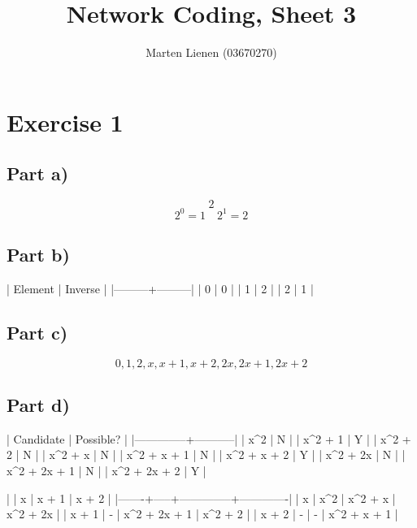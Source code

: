\documentclass[10pt,a4paper]{article}
\title{Network Coding, Sheet 3}
\author{Marten Lienen (03670270)}
\begin{document}
\maketitle

\section*{Exercise 1}

\subsection*{Part a)}

\begin{equation*}
  2
\end{equation*}
\begin{equation*}
  2^{0} = 1 \quad 2^{1} = 2
\end{equation*}

\subsection*{Part b)}

| Element | Inverse |
|---------+---------|
|       0 |       0 |
|       1 |       2 |
|       2 |       1 |

\subsection*{Part c)}

\begin{equation*}
  0, 1, 2, x, x + 1, x + 2, 2x, 2x + 1, 2x + 2
\end{equation*}

\subsection*{Part d)}

| Candidate    | Possible? |
|--------------+-----------|
| x^2          | N         |
| x^2 + 1      | Y         |
| x^2 + 2      | N         |
| x^2 + x      | N         |
| x^2 + x + 1  | N         |
| x^2 + x + 2  | Y         |
| x^2 + 2x     | N         |
| x^2 + 2x + 1 | N         |
| x^2 + 2x + 2 | Y         |

|       | x   | x + 1        | x + 2       |
|-------+-----+--------------+-------------|
| x     | x^2 | x^2 + x      | x^2 + 2x    |
| x + 1 | -   | x^2 + 2x + 1 | x^2 + 2     |
| x + 2 | -   | -            | x^2 + x + 1 |
\end{document}
